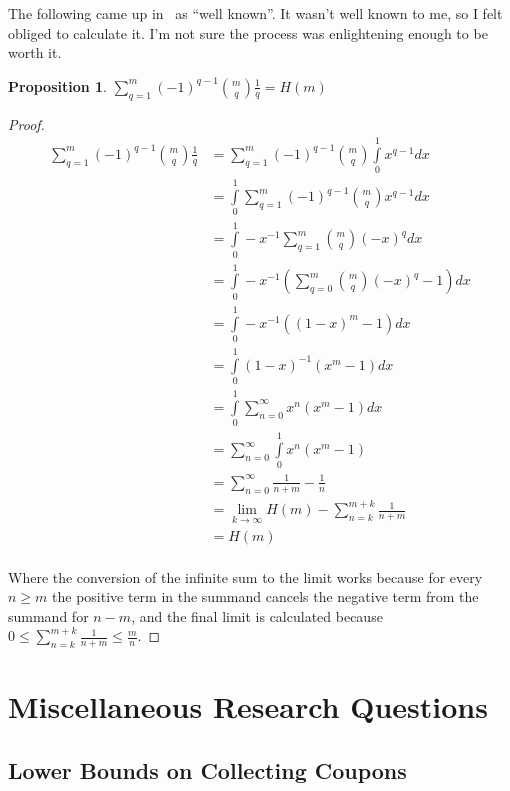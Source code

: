 \documentclass[a4paper]{book}
\newtheorem{proposition}{Proposition}
\begin{document}
The following came up in~\cite{DBLP:journals/dam/FlajoletGT92} as ``well known''.
It wasn't well known to me,
so I felt obliged to calculate it.
I'm not sure the process was enlightening enough to be worth it.

\begin{proposition}
\(\sum\limits_{q = 1}^m {(-1)}^{q - 1} {m \choose q} \frac{1}{q} = H(m)\)
\end{proposition}

\begin{proof}
\begin{align*}
\sum\limits_{q = 1}^m {(-1)}^{q - 1} {m \choose q} \frac{1}{q} &= \sum\limits_{q = 1}^m {(-1)}^{q - 1} {m \choose q} \int\limits_0^1 x^{q - 1} dx\\
&= \int\limits_0^1 \sum\limits_{q = 1}^m {(-1)}^{q - 1} {m \choose q} x^{q - 1} dx\\
&= \int\limits_0^1 -x^{-1} \sum\limits_{q = 1}^m {m \choose q} {(-x)}^q dx\\
&= \int\limits_0^1 -x^{-1} \left( \sum\limits_{q = 0}^m {m \choose q} {(-x)}^q - 1 \right)dx \\
&= \int\limits_0^1 -x^{-1} \left( {(1 - x)}^m - 1 \right)dx \\
&= \int\limits_0^1 {(1 - x)}^{-1} (x^m - 1) dx \\
&= \int\limits_0^1 \sum\limits_{n = 0}^\infty x^n (x^m - 1) dx \\
&= \sum\limits_{n = 0}^\infty \int\limits_0^1 x^n (x^m - 1) \\
&= \sum\limits_{n = 0}^\infty \frac{1}{n + m} - \frac{1}{n} \\
&= \lim\limits_{k \to \infty}  H(m) - \sum\limits_{n = k}^{m + k} \frac{1}{n + m}\\
&= H(m)\\
\end{align*}

Where the conversion of the infinite sum to the limit works because for every \(n \geq m\) the positive term in the summand cancels the negative term from the summand for \(n - m\),
and the final limit is calculated because \(0 \leq \sum\limits_{n = k}^{m + k} \frac{1}{n + m} \leq \frac{m}{n}\).
\end{proof}

\chapter{Miscellaneous Research Questions}

\section{Lower Bounds on Collecting Coupons}
\end{document}
